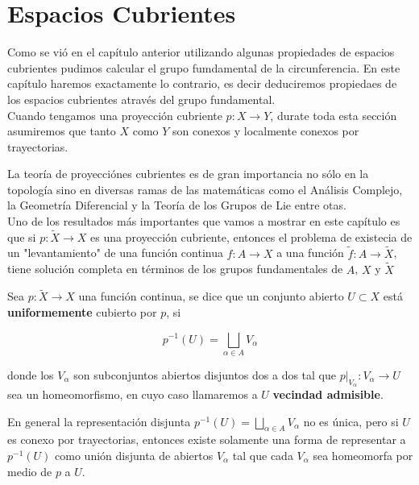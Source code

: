 \chapter{Espacios Cubrientes}

Como se vi\'o en el cap\'itulo anterior utilizando algunas propiedades de espacios cubrientes pudimos calcular el grupo fumdamental de la circunferencia. En este cap\'itulo haremos exactamente lo contrario, es decir deduciremos propiedaes de los espacios cubrientes atrav\'es del grupo fundamental.\\
Cuando tengamos una proyecci\'on cubriente $p:X \rightarrow Y$, durate toda esta secci\'on asumiremos que tanto $X$ como $Y$ son conexos y localmente conexos por trayectorias.

La teor\'ia de proyecci\'ones cubrientes es de gran importancia no s\'olo en la topolog\'ia sino en diversas ramas de las matem\'aticas como el An\'alisis Complejo, la Geometr\'ia Diferencial y la Teor\'ia de los Grupos de Lie entre otas.\\

Uno de los resultados m\'as importantes que vamos a mostrar en este cap\'itulo es que si $p: \widetilde{X} \rightarrow X$ es una proyecci\'on cubriente, entonces el problema de existecia de un "levantamiento" de una funci\'on continua $f:A \rightarrow X$ a una funci\'on $ \widetilde{f} :A \rightarrow \widetilde{X}$, tiene soluci\'on completa en t\'erminos de los grupos fundamentales de $A$, $X$ y $\widetilde{X}$\\


\begin{definition}\label{vec admisible}
Sea $p: \widetilde{X} \rightarrow X$ una funci\'on continua, se dice que un conjunto abierto $U \subset X$ est\'a \textbf{uniformemente} cubierto por $p$, si

\begin{equation}
 p^{-1}(U)= \bigsqcup_{\alpha \in A} V_{\alpha} 
\end{equation}

donde los $V_{\alpha}$ son subconjuntos abiertos disjuntos dos a dos tal que $p \vert_{V_{\alpha}}:V_{\alpha} \rightarrow U$ sea un homeomorfismo, en cuyo caso llamaremos a $U$ \textbf{vecindad admisible}. 
\end{definition}

En general la representaci\'on disjunta $p^{-1}(U)= \bigsqcup_{\alpha \in A} V_{\alpha}$ no es \'unica, pero si $U$ es conexo por trayectorias, entonces existe solamente una forma de representar a $p^{-1}(U)$ como uni\'on disjunta de abiertos $V_{\alpha}$ tal que cada $V_{\alpha}$ sea homeomorfa por medio de $p$ a $U$.\\

